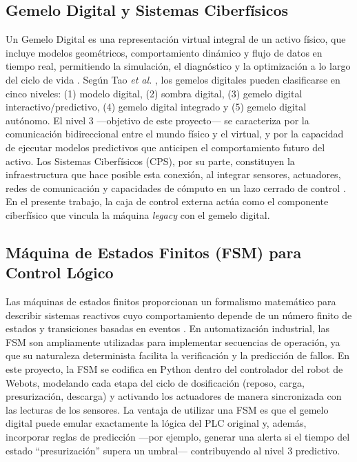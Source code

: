 \subsection*{Gemelo Digital y Sistemas Ciberfísicos}
Un Gemelo Digital es una representación virtual integral de un activo físico, que incluye modelos geométricos, comportamiento dinámico y flujo de datos en tiempo real, permitiendo la simulación, el diagnóstico y la optimización a lo largo del ciclo de vida \cite{rasheed2020digital}. Según Tao \textit{et al.} \cite{tao2019digital}, los gemelos digitales pueden clasificarse en cinco niveles: (1) modelo digital, (2) sombra digital, (3) gemelo digital interactivo/predictivo, (4) gemelo digital integrado y (5) gemelo digital autónomo. El nivel 3 —objetivo de este proyecto— se caracteriza por la comunicación bidireccional entre el mundo físico y el virtual, y por la capacidad de ejecutar modelos predictivos que anticipen el comportamiento futuro del activo. Los Sistemas Ciberfísicos (CPS), por su parte, constituyen la infraestructura que hace posible esta conexión, al integrar sensores, actuadores, redes de comunicación y capacidades de cómputo en un lazo cerrado de control \cite{lee2015architecture}. En el presente trabajo, la caja de control externa actúa como el componente ciberfísico que vincula la máquina \textit{legacy} con el gemelo digital.

\subsection*{Máquina de Estados Finitos (FSM) para Control Lógico}
Las máquinas de estados finitos proporcionan un formalismo matemático para describir sistemas reactivos cuyo comportamiento depende de un número finito de estados y transiciones basadas en eventos \cite{cassandras2008introduction}. En automatización industrial, las FSM son ampliamente utilizadas para implementar secuencias de operación, ya que su naturaleza determinista facilita la verificación y la predicción de fallos. En este proyecto, la FSM se codifica en Python dentro del controlador del robot de Webots, modelando cada etapa del ciclo de dosificación (reposo, carga, presurización, descarga) y activando los actuadores de manera sincronizada con las lecturas de los sensores. La ventaja de utilizar una FSM es que el gemelo digital puede emular exactamente la lógica del PLC original y, además, incorporar reglas de predicción —por ejemplo, generar una alerta si el tiempo del estado “presurización” supera un umbral— contribuyendo al nivel 3 predictivo.

